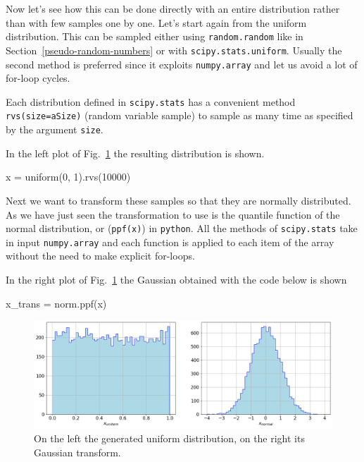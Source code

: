Now let's see how this can be done directly with an entire distribution rather than with few samples one by one. Let's start again from the uniform distribution. This can be sampled either using \texttt{random.random} like in Section~\ref{pseudo-random-numbers} or with \texttt{scipy.stats.uniform}. Usually the second method is preferred since it exploits \texttt{numpy.array} and let us avoid a lot of for-loop cycles. 

Each distribution defined in \texttt{scipy.stats} has a convenient method \texttt{rvs(size=aSize)} (random variable sample) to sample as many time as specified by the argument \texttt{size}. 

In the left plot of Fig.~\ref{fig:uniform_and_gauss} the resulting distribution is shown.

\begin{ipython}
x = uniform(0, 1).rvs(10000)
\end{ipython}

Next we want to transform these samples so that they are normally distributed. As we have just seen the transformation to use is the quantile function of the normal distribution, or (\texttt{ppf(x)}) in \texttt{python}. All the methods of \texttt{scipy.stats} take in input \texttt{numpy.array} and each function is applied to each item of the array without the need to make explicit for-loops.

In the right plot of Fig.~\ref{fig:uniform_and_gauss} the Gaussian obtained with the code below is shown

\begin{ipython}
x_trans = norm.ppf(x)
\end{ipython}

\begin{figure}[htb]
\centering
\includegraphics[width=1.\textwidth]{figures/uniform_gauss}
\caption{On the left the generated uniform distribution, on the right its Gaussian transform.}
\label{fig:uniform_and_gauss}
\end{figure}


